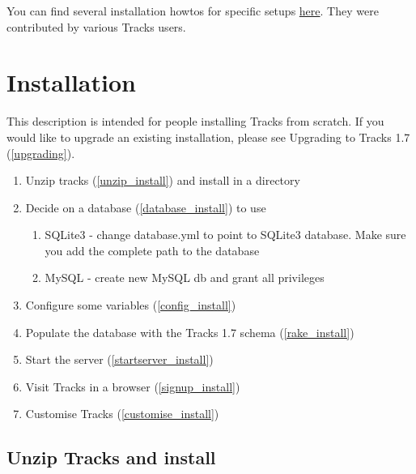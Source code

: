 \documentclass[10pt,twoside]{memoir}
\begin{document}
You can find several installation howtos for specific setups \href{http://dev.rousette.org.uk/wiki/Tracks/Install}{here}. They were contributed by various Tracks users.


\section{Installation}
\label{installation}

This description is intended for people installing Tracks from scratch. If you would like to upgrade an existing installation, please see Upgrading to Tracks 1.7 (\autoref{upgrading}).


\begin{enumerate}


\item Unzip tracks (\autoref{unzip_install}) and install in a directory

\item Decide on a database (\autoref{database_install}) to use
\begin{enumerate}


\item SQLite3 - change database.yml to point to SQLite3 database. Make sure you add the complete path to the database

\item MySQL - create new MySQL db and grant all privileges 
\end{enumerate}



\item Configure some variables (\autoref{config_install})

\item Populate the database with the Tracks 1.7 schema (\autoref{rake_install})

\item Start the server (\autoref{startserver_install})

\item Visit Tracks in a browser (\autoref{signup_install})

\item Customise Tracks (\autoref{customise_install})
\end{enumerate}

\subsection{Unzip Tracks and install}
\label{unzip_install}
\end{document}
